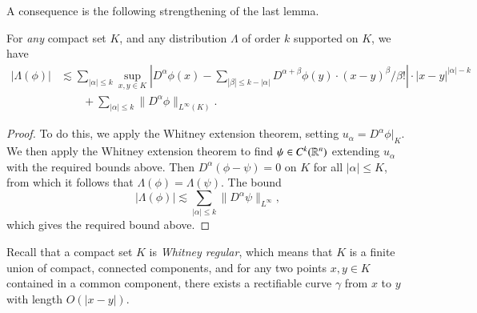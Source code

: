 A consequence is the following strengthening of the last lemma.

\begin{lemma}
    For \emph{any} compact set $K$, and any distribution $\Lambda$ of order $k$ supported on $K$, we have
    \begin{align*}
        |\Lambda(\phi)| &\lesssim \sum_{|\alpha| \leq k} \sup_{x,y \in K} \left| D^\alpha \phi(x) - \sum_{|\beta| \leq k - |\alpha|} D^{\alpha + \beta} \phi(y) \cdot (x - y)^\beta / \beta! \right| \cdot |x - y|^{|\alpha| - k}\\
        &\quad\quad + \sum_{|\alpha| \leq k} \| D^\alpha \phi \|_{L^\infty(K)}.
    \end{align*}
\end{lemma}
\begin{proof}
    To do this, we apply the Whitney extension theorem, setting $u_\alpha = D^\alpha \phi |_K$. We then apply the Whitney extension theorem to find $\psi \in C^k(\operatorname{\mathbb{R}}^n)$ extending $u_\alpha$ with the required bounds above. Then $D^\alpha(\phi - \psi) = 0$ on $K$ for all $|\alpha| \leq K$, from which it follows that $\Lambda(\phi) = \Lambda(\psi)$. The bound
    \[ |\Lambda(\phi)| \lesssim \sum_{|\alpha| \leq k} \| D^\alpha \psi \|_{L^\infty}, \]
    which gives the required bound above.
\end{proof}

Recall that a compact set $K$ is \emph{Whitney regular}, which means that $K$ is a finite union of compact, connected components, and for any two points $x,y \in K$ contained in a common component, there exists a rectifiable curve $\gamma$ from $x$ to $y$ with length $O(|x - y|)$.

